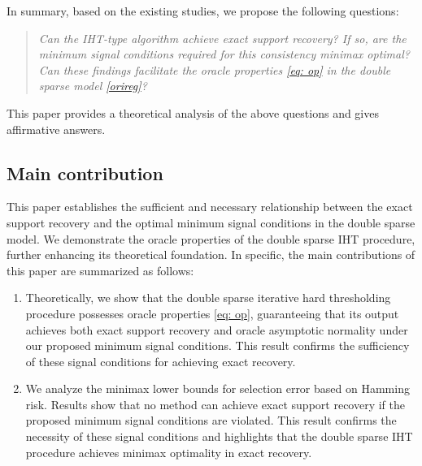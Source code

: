 \documentclass[12pt]{article}
\begin{document}
In summary, based on the existing studies, we propose the following questions:
\begin{quote}
\emph{Can the IHT-type algorithm achieve exact support recovery? 
If so, are the minimum signal conditions required for this consistency minimax optimal?
Can these findings facilitate the oracle properties \eqref{eq: op} in the double sparse model \eqref{orireg}?}
\end{quote}
This paper provides a theoretical analysis of the above questions and gives affirmative answers.

\subsection{Main contribution}\label{subsec:contribute}
This paper establishes the sufficient and necessary relationship between the exact support recovery and the optimal minimum signal conditions in the double sparse model. 
We demonstrate the oracle properties of the double sparse IHT procedure, further enhancing its theoretical foundation.
In specific, the main contributions of this paper are summarized as follows:  

\begin{enumerate}
\item  Theoretically, we show that the double sparse iterative hard thresholding procedure possesses oracle properties \eqref{eq: op}, guaranteeing that its output achieves both exact support recovery and oracle asymptotic normality under our proposed minimum signal conditions. 
This result confirms the sufficiency of these signal conditions for achieving exact recovery.
 
\item We analyze the minimax lower bounds for selection error based on Hamming risk. Results show that no method can achieve exact support recovery if the proposed minimum signal conditions are violated. 
This result confirms the necessity of these signal conditions and highlights that the double sparse IHT procedure achieves minimax optimality in exact recovery.
\end{enumerate}
\end{document}
